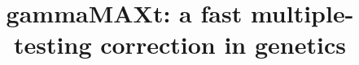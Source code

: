 \documentclass{bmcart}
\begin{document}
\begin{frontmatter}

\begin{fmbox}


\title{gammaMAXt: a fast multiple-testing correction in genetics}


\author[
   addressref={aff1,aff2},                   %
   corref={aff1},                       %
   email={F.VanLishout@ulg.ac.be}   %
]{ }
\author[
   addressref={aff1,aff2},
   email={Francesco.Gadaleta@ulg.ac.be}
]{ }
\author[
   addressref={aff3},
   email={jason.h.moore@dartmouth.edu}
]{ }
\author[
   addressref={aff1,aff2},
   email={L.Wehenkel@ulg.ac.be}
]{ }
\author[
   addressref={aff1,aff2},
   email={kristel.vansteen@ulg.ac.be}
]{ }



\end{fmbox}
\end{frontmatter}
\end{document}
